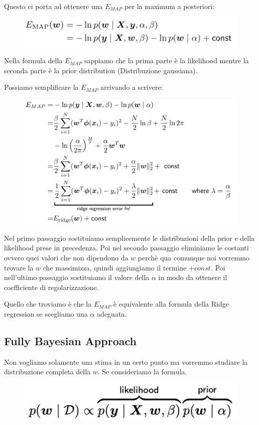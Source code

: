 \documentclass[14pt]{extreport}
\begin{document}
Questo ci porta ad ottenere una $E_{MAP}$ per la maximum a posteriori:

\begin{figure}[H]
\centering
\includegraphics[width=0.7\linewidth]{121.jpeg}
\end{figure}

Nella formula della $E_{MAP}$ sappiamo che la prima parte è la likelihood mentre la seconda parte è la prior distribution (Distribuzione gaussiana).

Possiamo semplificare la $E_{MAP}$ arrivando a scrivere:

\begin{figure}[H]
\centering
\includegraphics[width=0.7\linewidth]{122.jpeg}
\end{figure}

Nel primo passaggio sostituiamo semplicemente le distribuzioni della prior e della likelihood prese in precedenza. Poi nel secondo passaggio
eliminiamo le costanti ovvero quei valori che non dipendono da $w$ perchè qua comunque noi vorremmo trovare la $w$ che massimizza, quindi aggiungiamo
il termine $+ const$. Poi nell'ultimo passaggio sostituiamo il valore della $\alpha$ in modo da ottenere il coefficiente di regolarizzazione.

Quello che troviamo è che la $E_{MAP}$ è equivalente alla formula della Ridge regression se scegliamo una $\alpha$ adeguata.

\subsection{Fully Bayesian Approach}

Non vogliamo solamente una stima in un certo punto ma vorremmo studiare la distribuzione completa della $w$. Se consideriamo la
formula.\begin{figure}[H]
\centering
\includegraphics[width=0.5\linewidth]{123.jpeg}
\end{figure}
\end{document}
